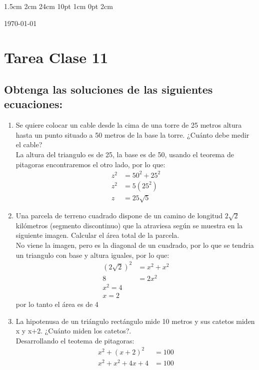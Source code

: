 \documentclass[12pt,letterpaper]{report}
\begin{document}
\setmargins{2.5cm}      
{1.5cm}                     
{2cm}  
{24cm}                    
{10pt}                          
{1cm}                          
{0pt}                             
{2cm}
\begin{flushright}
\today
\end{flushright}
\vspace{-1.75cm}
\section*{Tarea Clase 11}
\subsection*{Obtenga las soluciones de las siguientes ecuaciones:}
\begin{enumerate}
\item Se quiere colocar un cable desde la cima de una torre de 25 metros altura hasta un punto situado a 50 metros de la base la torre. ¿Cuánto debe medir el cable?\\
La altura del triangulo es de 25, la base es de 50, usando el teorema de pitagoras encontraremos el otro lado, por lo que:
\begin{align*}
    z^2&=50^2+25^2\\
    z^2&=5(25^2)\\
    z&=25\sqrt{5}
\end{align*}
\item Una parcela de terreno cuadrado dispone de un camino de longitud $2\sqrt{2}$ kilómetros (segmento discontinuo) que la atraviesa según se muestra en la siguiente imagen. Calcular el área total de la parcela.\\
No viene la imagen, pero es la diagonal de un cuadrado, por lo que se tendria un triangulo con base y altura iguales, por lo que:
\begin{align*}
    (2\sqrt{2})^2 &=x^2 + x^2\\
    8&=2x^2\\
    x^2=4\\
    x=2
\end{align*}
por lo tanto el área es de 4
\item La hipotenusa de un triángulo rectángulo mide 10 metros y sus catetos miden x y x+2. ¿Cuánto miden los catetos?.\\
Desarrollando el teotema de pitagoras:
\begin{align*}
    x^2+(x+2)^2&=100\\
    x^2+x^2+4x+4&=100\\

\end{align*}
\end{enumerate}
\end{document}
